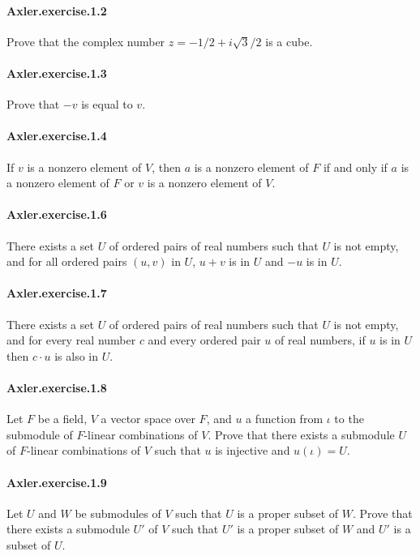 \documentclass{article}
\begin{document}
\paragraph{Axler.exercise.1.2} Prove that the complex number $z = -1/2 + i\sqrt{3}/2$ is a cube.

\paragraph{Axler.exercise.1.3} Prove that $-v$ is equal to $v$.

\paragraph{Axler.exercise.1.4} If $v$ is a nonzero element of $V$, then $a$ is a nonzero element of $F$ if and only if $a$ is a nonzero element of $F$ or $v$ is a nonzero element of $V$.

\paragraph{Axler.exercise.1.6} There exists a set $U$ of ordered pairs of real numbers such that $U$ is not empty, and for all ordered pairs $(u, v)$ in $U$, $u + v$ is in $U$ and $-u$ is in $U$.

\paragraph{Axler.exercise.1.7} There exists a set $U$ of ordered pairs of real numbers such that $U$ is not empty, and for every real number $c$ and every ordered pair $u$ of real numbers, if $u$ is in $U$ then $c \cdot u$ is also in $U$.

\paragraph{Axler.exercise.1.8} Let $F$ be a field, $V$ a vector space over $F$, and $u$ a function from $\iota$ to the submodule of $F$-linear combinations of $V$. Prove that there exists a submodule $U$ of $F$-linear combinations of $V$ such that $u$ is injective and $u(\iota) = U$.

\paragraph{Axler.exercise.1.9} Let $U$ and $W$ be submodules of $V$ such that $U$ is a proper subset of $W$. Prove that there exists a submodule $U'$ of $V$ such that $U'$ is a proper subset of $W$ and $U'$ is a subset of $U$.
\end{document}
